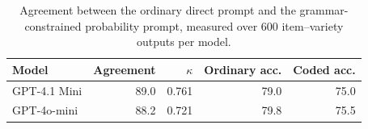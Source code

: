\begin{table}[t]
\centering
\caption{Agreement between the ordinary direct prompt and the grammar-constrained probability prompt, measured over 600 item--variety outputs per model.}
\label{tab:prompt-agreement}
\small
\begin{tabular}{lrrrr}
\toprule
Model & Agreement & $\kappa$ & Ordinary acc. & Coded acc. \\
\midrule
GPT-4.1 Mini & 89.0 & 0.761 & 79.0 & 75.0 \\
GPT-4o-mini & 88.2 & 0.721 & 79.8 & 75.5 \\
\bottomrule
\end{tabular}
\end{table}
